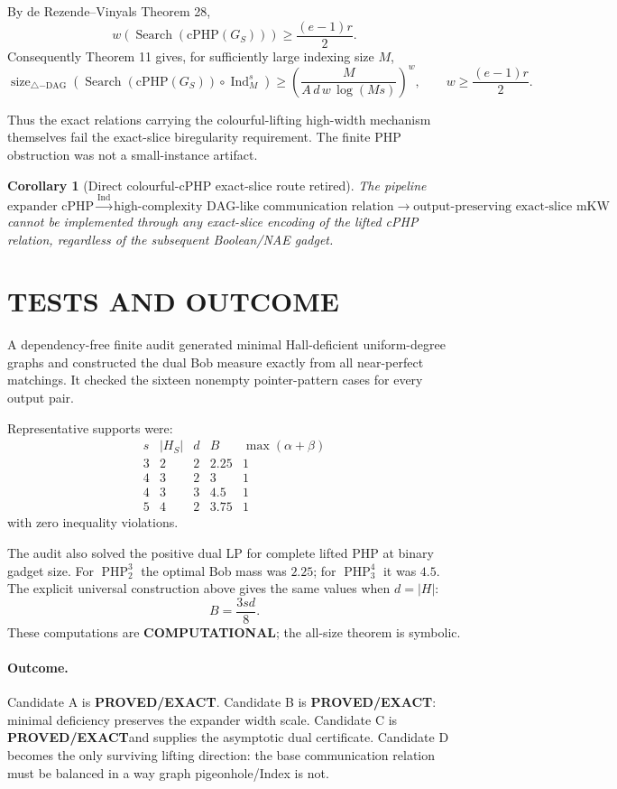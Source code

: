 \documentclass[11pt]{article}
\newtheorem{corollary}[theorem]{Corollary}
\newcommand{\EXACT}{\textbf{PROVED/EXACT}}
\newcommand{\COMP}{\textbf{COMPUTATIONAL}}
\begin{document}
By de Rezende--Vinyals Theorem 28,
\[
\boxed{
w(\operatorname{Search}(\mathrm{cPHP}(G_S)))
\ge
\frac{(e-1)r}{2}.
}
\]
Consequently Theorem 11 gives, for sufficiently large indexing size $M$,
\[
\operatorname{size}_{\triangle\mathrm{-DAG}}
\left(
\operatorname{Search}(\mathrm{cPHP}(G_S))
\circ\operatorname{Ind}_M^s
\right)
\ge
\left(
\frac{M}{
A\,d\,w\,\log(Ms)
}
\right)^w,
\qquad
w\ge\frac{(e-1)r}{2}.
\]

Thus the exact relations carrying the colourful-lifting high-width mechanism themselves fail the exact-slice biregularity requirement. The finite PHP obstruction was not a small-instance artifact.

\begin{corollary}[Direct colourful-cPHP exact-slice route retired]
The pipeline
\[
\boxed{
\text{expander cPHP}
\stackrel{\operatorname{Ind}}{\longrightarrow}
\text{high-complexity DAG-like communication relation}
\longrightarrow
\text{output-preserving exact-slice mKW}
}
\]
cannot be implemented through any exact-slice encoding of the lifted cPHP relation, regardless of the subsequent Boolean/NAE gadget.
\end{corollary}

\section{TESTS AND OUTCOME}
A dependency-free finite audit generated minimal Hall-deficient uniform-degree graphs and constructed the dual Bob measure exactly from all near-perfect matchings. It checked the sixteen nonempty pointer-pattern cases for every output pair.

Representative supports were:
\[
\begin{array}{c|c|c|c|c}
s&|H_S|&d&B&\max(\alpha+\beta)\\ \hline
3&2&2&2.25&1\\
4&3&2&3&1\\
4&3&3&4.5&1\\
5&4&2&3.75&1
\end{array}
\]
with zero inequality violations.

The audit also solved the positive dual LP for complete lifted PHP at binary gadget size. For $\operatorname{PHP}_2^3$ the optimal Bob mass was $2.25$; for $\operatorname{PHP}_3^4$ it was $4.5$. The explicit universal construction above gives the same values when $d=|H|$:
\[
B=\frac{3sd}{8}.
\]
These computations are \COMP; the all-size theorem is symbolic.

\paragraph{Outcome.}
Candidate A is \EXACT. Candidate B is \EXACT: minimal deficiency preserves the expander width scale. Candidate C is \EXACT and supplies the asymptotic dual certificate. Candidate D becomes the only surviving lifting direction: the base communication relation must be balanced in a way graph pigeonhole/Index is not.
\end{document}
